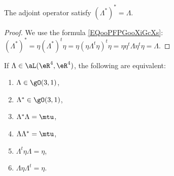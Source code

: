 \begin{lemma}       \label{LEMooVRWJooPsDRwU}
    The adjoint operator satisfy \( (\Lambda^*)^*=\Lambda\).
\end{lemma}

\begin{proof}
    We use the formula \eqref{EQooPFPGooXiGcXs}: $(\Lambda^*)^*=\eta (\Lambda^*)^t\eta=\eta(\eta \Lambda^t\eta)^t\eta=\eta\eta^t\Lambda\eta^t\eta=\Lambda$.
\end{proof}

\begin{lemma}       \label{LEMooDLWDooWCXlWq}
    If \( \Lambda\in \aL(\eR^4,\eR^4)\), the following are equivalent:
            \begin{enumerate}
                \item \( \Lambda\in\gO(3,1)\),      \label{ITEMooWHGKooFPfujT}  
                \item \( \Lambda^*\in \gO(3,1)\),   \label{ITEMooNISDooMajEMS}
                \item \( \Lambda^*\Lambda=\mtu\),       \label{ITEMooNLZGooUINRiP}
                \item \( \Lambda\Lambda^*=\mtu\),       \label{ITEMooFFRVooOwLmnz}
                \item \( \Lambda^t\eta\Lambda=\eta\),       \label{ITEMooOYTDooCWImBJ}
                \item \( \Lambda\eta\Lambda^t=\eta\).       \label{ITEMooAEEYooDiJuEi}
            \end{enumerate}
\end{lemma}

